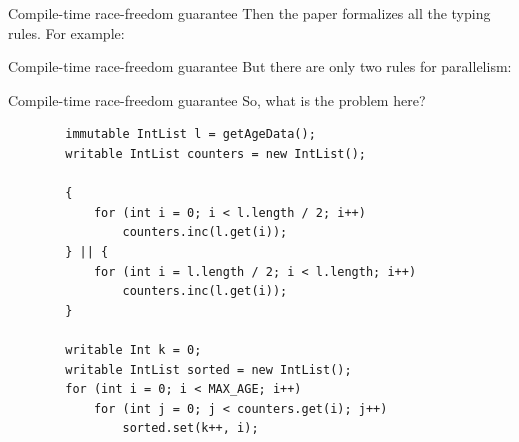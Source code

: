 \documentclass[handout]{beamer} %
\begin{document}
\begin{frame}{Compile-time race-freedom guarantee}
	Then the paper formalizes all the typing rules. For example:
	\begin{center}
	\end{center}
\end{frame}


\begin{frame}{Compile-time race-freedom guarantee}
	But there are only two rules for parallelism:
	\begin{center}
	\end{center}
\end{frame}


\begin{frame}[fragile]{Compile-time race-freedom guarantee}
	So, what is the problem here?
	\begin{lstlisting}
        immutable IntList l = getAgeData();
        writable IntList counters = new IntList();
        
        {
            for (int i = 0; i < l.length / 2; i++)
                counters.inc(l.get(i));
        } || {
            for (int i = l.length / 2; i < l.length; i++)
                counters.inc(l.get(i));
        }
        
        writable Int k = 0;
        writable IntList sorted = new IntList();
        for (int i = 0; i < MAX_AGE; i++)
            for (int j = 0; j < counters.get(i); j++)
                sorted.set(k++, i);
	\end{lstlisting}
\end{frame}
\end{document}
